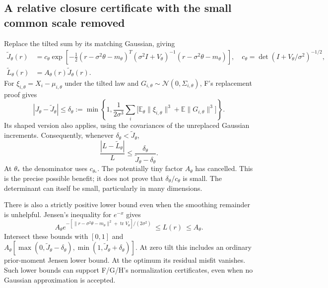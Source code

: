 \documentclass[10pt,a4paper]{article}
\newcommand{\E}{\mathbb E}
\begin{document}
\subsection{A relative closure certificate with the small common scale removed}
Replace the tilted sum by its matching Gaussian, giving
\begin{align}
 \widetilde J_\theta(r)
 &=c_\theta
  \exp\!\left[-\tfrac12(r-\sigma^2\theta-m_\theta)^T
        (\sigma^2I+V_\theta)^{-1}(r-\sigma^2\theta-m_\theta)\right],
 \quad c_\theta=\det(I+V_\theta/\sigma^2)^{-1/2},\\
 \widetilde L_\theta(r)&=A_\theta(r)\widetilde J_\theta(r).
 \label{eq:tilted-gaussian}
\end{align}
For $\xi_{i,\theta}=X_i-\mu_{i,\theta}$ under the tilted law and
$G_{i,\theta}\sim\mathcal N(0,\Sigma_{i,\theta})$, F's replacement proof gives
\[
 |J_\theta-\widetilde J_\theta|\leq
 \delta_\theta:=
 \min\!\left\{1,\frac1{2\sigma^3}\sum_i
       \big[\E_\theta\|\xi_{i,\theta}\|^3+\E\|G_{i,\theta}\|^3\big]\right\}.
\]
Its shaped version also applies, using the covariances of the unreplaced Gaussian increments.
Consequently, whenever $\delta_\theta<\widetilde J_\theta$,
\begin{equation}
 \frac{|L-\widetilde L_\theta|}{L}
 \leq\frac{\delta_\theta}{\widetilde J_\theta-\delta_\theta}.
 \label{eq:tilted-relative-error}
\end{equation}
At $\theta_*$ the denominator uses $c_{\theta_*}$. The potentially tiny factor $A_\theta$ has cancelled.
This is the precise possible benefit; it does not prove that $\delta_\theta/c_\theta$ is small.
The determinant can itself be small, particularly in many dimensions.

There is also a strictly positive lower bound even when the smoothing remainder is unhelpful.
Jensen's inequality for $e^{-x}$ gives
\begin{equation}
 A_\theta
 e^{-[\|r-\sigma^2\theta-m_\theta\|^2+\operatorname{tr}V_\theta]/(2\sigma^2)}
 \ \leq L(r)\ \leq A_\theta.
 \label{eq:tilted-jensen}
\end{equation}
Intersect these bounds with $[0,1]$ and
$A_\theta[\max(0,\widetilde J_\theta-\delta_\theta),
            \min(1,\widetilde J_\theta+\delta_\theta)]$.
At zero tilt this includes an ordinary prior-moment Jensen lower bound. At the optimum its residual
misfit vanishes. Such lower bounds can support F/G/H's normalization certificates, even when no Gaussian
approximation is accepted.
\end{document}
